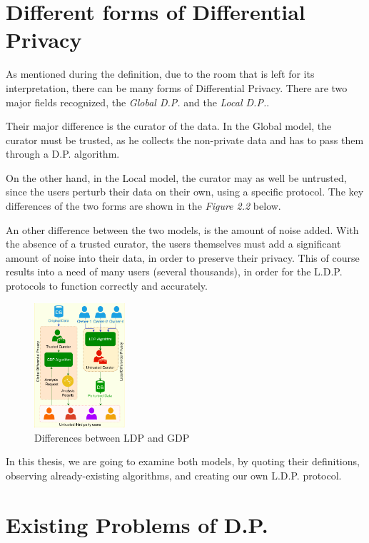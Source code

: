 \section{Different forms of Differential Privacy}

As mentioned during the definition, due to the room that is left for its interpretation, there can be many forms of Differential Privacy. There are two major fields recognized, the \emph{Global D.P.} and the \emph{Local D.P.}.

Their major difference is the curator of the data. In the Global model, the curator must be trusted, as he collects the non-private data and has to pass them through a D.P. algorithm.

On the other hand, in the Local model, the curator may as well be untrusted, since the users perturb their data on their own, using a specific protocol. The key differences of the two forms are shown in the \emph{Figure 2.2} below.

An other difference between the two models, is the amount of noise added. With the absence of a trusted curator, the users themselves must add a significant amount of noise into their data, in order to preserve their privacy. This of course results into a need of many users (several thousands), in order for the L.D.P. protocols to function correctly and accurately.


\begin{figure}[!htb]\centering
      \includegraphics[width=0.3\textwidth]{images/local_vs_global.png}
  \caption{Differences between LDP and GDP}
\end{figure}

In this thesis, we are going to examine both models, by quoting their definitions, observing already-existing algorithms, and creating our own L.D.P. protocol.

\section{Existing Problems of D.P.}

